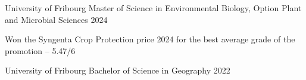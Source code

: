 

\begin{cventries}

  \cventrynoloc
    {University of Fribourg} %
    {Master of Science in Environmental Biology, Option Plant and Microbial Sciences} %
    {2024} %
    {
      \begin{cvitems} %
        \item {Won the Syngenta Crop Protection price 2024 for the best average grade of the promotion -- 5.47/6}
      \end{cvitems}
    }

  \cventrynoloc
    {University of Fribourg} %
    {Bachelor of Science in Geography} %
    {2022} %
    {}

\end{cventries}
